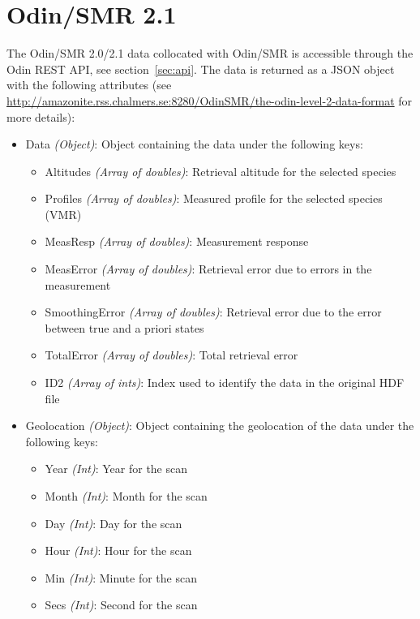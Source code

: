 \section{Odin/SMR 2.1}
The Odin/SMR 2.0/2.1 data collocated with Odin/SMR is accessible through the
Odin REST API, see section~\ref{sec:api}. The data is returned as a JSON object
with the following attributes (see
\url{http://amazonite.rss.chalmers.se:8280/OdinSMR/the-odin-level-2-data-format}
for more details):
\begin{itemize}
    \item Data \emph{(Object)}: Object containing the data under the
        following keys:
        \begin{itemize}
            \item Altitudes \emph{(Array of doubles)}: Retrieval altitude for
                the selected species
            \item Profiles \emph{(Array of doubles)}: Measured profile for the
                selected species (VMR)
            \item MeasResp \emph{(Array of doubles)}: Measurement response
            \item MeasError \emph{(Array of doubles)}: Retrieval error due to
                errors in the measurement
            \item SmoothingError \emph{(Array of doubles)}: Retrieval error due
                to the error between true and a priori states
            \item TotalError \emph{(Array of doubles)}: Total retrieval error
            \item ID2 \emph{(Array of ints)}: Index used to identify the data
                in the original HDF file
        \end{itemize}
    \item Geolocation \emph{(Object)}: Object containing the
        geolocation of the data under the following keys:
        \begin{itemize}
            \item Year \emph{(Int)}: Year for the scan
            \item Month \emph{(Int)}: Month for the scan
            \item Day \emph{(Int)}: Day for the scan
            \item Hour \emph{(Int)}: Hour for the scan
            \item Min \emph{(Int)}: Minute for the scan
            \item Secs \emph{(Int)}: Second for the scan

\end{itemize}
\end{itemize}
